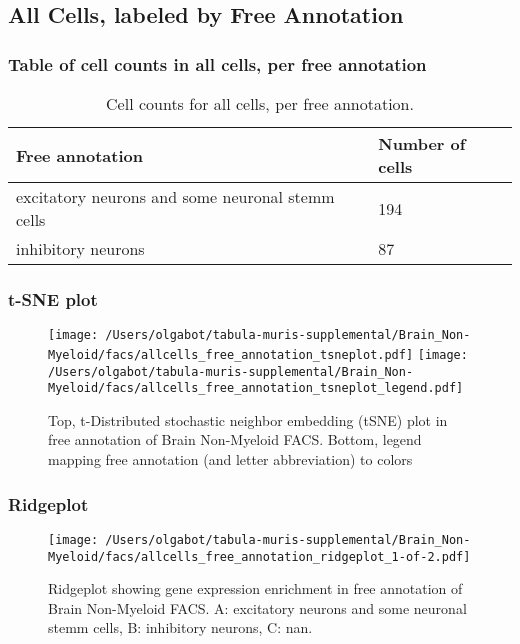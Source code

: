 \clearpage
\subsection{All Cells, labeled by Free Annotation}
\subsubsection{Table of cell counts in all cells, per free annotation}\begin{table}[h]
\centering
\label{my-label}
\begin{tabular}{@{}ll@{}}
\toprule

Free annotation& Number of cells \\ \midrule
excitatory neurons and some neuronal stemm cells & 194 \\

inhibitory neurons & 87 \\
\bottomrule
\end{tabular}
\caption{Cell counts for all cells, per free annotation.}
\end{table}

\clearpage
\subsubsection{t-SNE plot}
\begin{figure}[h]
\centering
\texttt{[image: /Users/olgabot/tabula-muris-supplemental/Brain\_Non-Myeloid/facs/allcells\_free\_annotation\_tsneplot.pdf]}
\texttt{[image: /Users/olgabot/tabula-muris-supplemental/Brain\_Non-Myeloid/facs/allcells\_free\_annotation\_tsneplot\_legend.pdf]}
\caption{Top, t-Distributed stochastic neighbor embedding (tSNE) plot  in free annotation of Brain Non-Myeloid FACS. Bottom, legend mapping free annotation (and letter abbreviation) to colors}
\end{figure}


\clearpage
\clearpage
\subsubsection{Ridgeplot}
\begin{figure}[h]
\centering
\texttt{[image: /Users/olgabot/tabula-muris-supplemental/Brain\_Non-Myeloid/facs/allcells\_free\_annotation\_ridgeplot\_1-of-2.pdf]}

\caption{ Ridgeplot  showing gene expression enrichment in free annotation of Brain Non-Myeloid FACS. A: excitatory neurons and some neuronal stemm cells, B: inhibitory neurons, C: nan.}
\end{figure}


